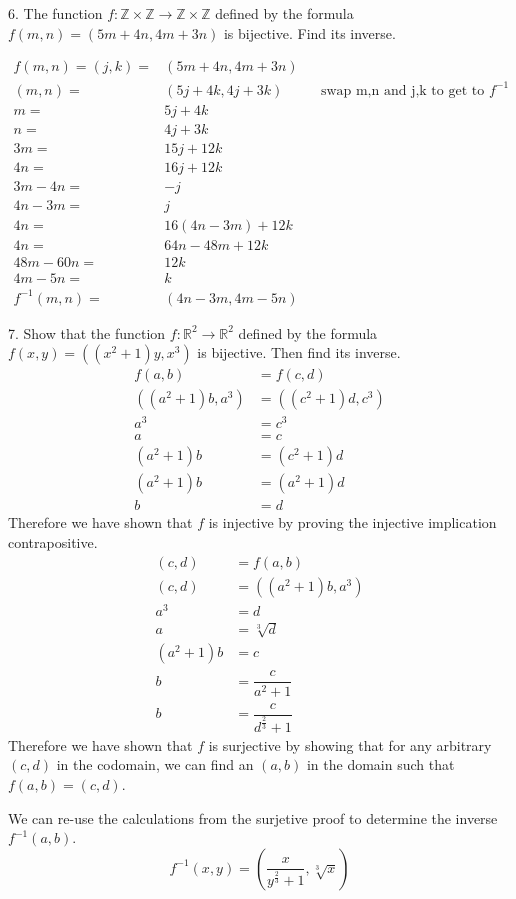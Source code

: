 \documentclass{hippoidC}
\begin{document}
\begin{prooflist}{6. The function $f: \mathbb{Z} \times \mathbb{Z} \rightarrow
    \mathbb{Z} \times \mathbb{Z}$ defined by the formula $f(m, n)=(5 m+4 n, 4
m+3 n)$ is bijective. Find its inverse.}
\item
\begin{align*}
    f(m, n)=(j, k)=&(5 m+4 n, 4 m+3 n)\\
    (m, n)=&(5 j+4 k, 4 j+3 k)&&\text{swap m,n and j,k to get to }f^{-1}\\
    m=&5 j+4 k\\
    n=&4 j+3 k\\
    3m=&15 j+12 k\\
    4n=&16 j+12 k\\
    3m-4n=&-j\\
    4n-3m=&j\\
    4n=&16 (4n-3m)+12 k\\
    4n=&64n-48m+12 k\\
    48m-60n=&12 k\\
    4m-5n=&k\\
    f^{-1}(m, n) =& (4n-3m, 4m-5n)
\end{align*}
\end{prooflist}

\begin{prooflist}{7. Show that the function $f: \mathbb{R}^2 \rightarrow
    \mathbb{R}^2$ defined by the formula $f(x, y)=\left(\left(x^2+1\right) y,
x^3\right)$ is bijective. Then find its inverse.}
\inj{}
\begin{align*}
    f(a, b)&=f(c, d)\\
    \left(\left(a^2+1\right)b, a^3\right)&= \left(\left(c^2+1\right)d, c^3\right)\\
    a^3&=c^3\\
    a&=c\\
    (a^2+1)b &= (c^2+1)d\\
    (a^2+1)b &= (a^2+1)d\\
    b &= d
\end{align*}
Therefore we have shown that $f$ is injective by proving the injective
implication contrapositive.
\surj{}
\begin{align*}
    (c, d) &= f(a, b)\\
    (c, d) &= \left(\left(a^2+1\right)b, a^3\right)\\
    a^3&=d\\
    a&=\sqrt[3]{d}\\
    (a^2+1)b&=c\\
    b&=\dfrac{c}{a^2+1}\\
    b&=\dfrac{c}{d^{\frac{2}{3}}+1}
\end{align*}
Therefore we have shown that $f$ is surjective by showing that for any arbitrary
$(c, d)$ in the codomain, we can find an $(a, b)$ in the domain such that $f(a,
b)=(c, d)$.
\item We can re-use the calculations from the surjetive proof to determine the inverse
$f^{-1}(a, b)$.
\[f^{-1}(x, y) = \left(\dfrac{x}{y^{\frac{2}{3}}+1}, \sqrt[3]{x}\right)
\]
\end{prooflist}
\end{document}
